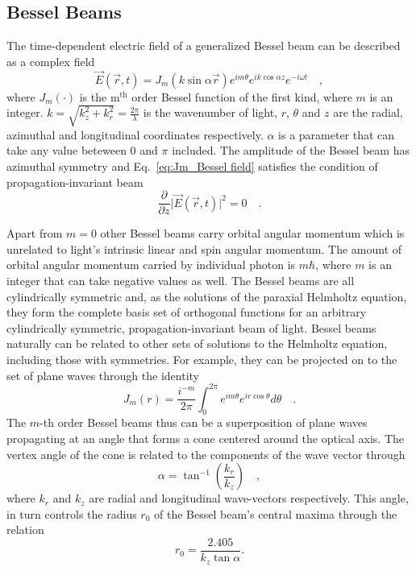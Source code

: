 \subsection{Bessel Beams}
\label{subsec:Bessel Beam}
The time-dependent electric field of a generalized Bessel beam \cite{bouchal1996, mcgloin2005} can be described as a complex field
\begin{equation}
\label{eq:Jm_Bessel field}
\vec{E}(\vec{r},t) = J_{m}(k \sin \alpha \vec{r})e^{im\theta}e^{ik\cos \alpha z}e^{-i\omega t} \quad ,
\end{equation}
where $J_m (\cdot)$ is the $\mathrm{m^{th}}$ order Bessel function of the first kind, where $m$ is an integer. $k = \sqrt{k^2_z + k^2_r} = \frac{2\pi}{\lambda}$ is  the wavenumber of light, $r$, $\theta$ and $z$ are the radial, azimuthal and longitudinal coordinates respectively. $\alpha$ is a parameter that can take any value beteween $0$ and $\pi$ included. The amplitude of the Bessel beam has azimuthal symmetry and Eq.~\eqref{eq:Jm_Bessel field} satisfies the condition of propagation-invariant beam
\begin{equation}
\label{eq:propagation invariant condition}
\frac{\partial}{\partial z}\vert \vec{E}(\vec{r},t)\vert ^2 = 0 \quad .
\end{equation}

Apart from $m=0$ other Bessel beams carry orbital angular momentum which is unrelated to light's intrinsic linear and spin angular momentum. The amount of orbital angular momentum carried by individual photon is $m\hbar$, where $m$ is an integer that can take negative values as well. The Bessel beams are all cylindrically symmetric and, as the solutions of the paraxial Helmholtz equation, they form the complete basis set of orthogonal functions for an arbitrary cylindrically symmetric, propagation-invariant beam of light. Bessel beams naturally can be related to other sets of solutions to the Helmholtz equation, including those with symmetries. For example, they can be projected on to the set of plane waves through the identity
 \begin{equation}
 \label{eq:Bessel Identity relation}
 J_m(r) = \frac{i^{-m}}{2\pi} \int _{0}^{2\pi}e^{im\theta}e^{ir\cos \theta }d\theta \quad .
 \end{equation}
The $m$-th order Bessel beams thus can be a superposition of plane waves propagating at an angle that forms a cone centered around the optical axis. The vertex angle of the cone is related to the components of the wave vector through
\begin{equation}
\label{eq:Bessel cone alpha}
\alpha = \tan ^{-1} \left(\frac{k_r}{k_z}\right)\quad ,
\end{equation}
where $k_r$ and $k_z$ are radial and longitudinal wave-vectors respectively. This angle, in turn controls the radius $r_0$ \cite{mcgloin2005} of the Bessel beam's central maxima through the relation
\begin{equation}
\label{eq:Bessel core spot size}
r_0 = \frac{2.405}{k_z \tan \alpha}.
\end{equation}


